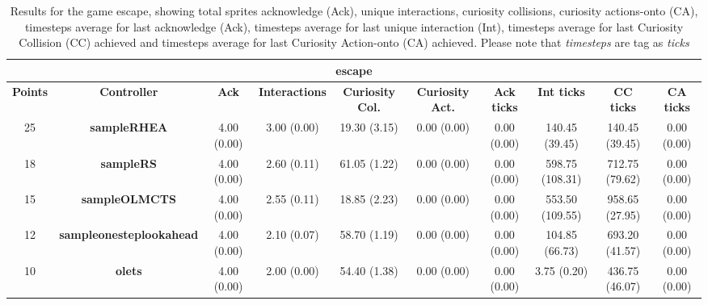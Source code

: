 \begin{table*}[!t]
\begin{center}
\begin{adjustbox}{width=1\textwidth}
\begin{tabular}{|c|c|c|c|c|c|c|c|c|c|}
\multicolumn{10}{c}{\textbf{escape}}\\
\hline
\textbf{Points} & \textbf{Controller} & \textbf{Ack} & \textbf{Interactions} & \textbf{Curiosity Col.} & \textbf{Curiosity Act.} & \textbf{Ack ticks} & \textbf{Int ticks} & \textbf{CC ticks} & \textbf{CA ticks}\\
\hline
25 & \textbf{sampleRHEA} & 4.00 (0.00) & 3.00 (0.00) & 19.30 (3.15) & 0.00 (0.00) & 0.00 (0.00) & 140.45 (39.45) & 140.45 (39.45) & 0.00 (0.00)
 \\
\hline
18 & \textbf{sampleRS} & 4.00 (0.00) & 2.60 (0.11) & 61.05 (1.22) & 0.00 (0.00) & 0.00 (0.00) & 598.75 (108.31) & 712.75 (79.62) & 0.00 (0.00)
 \\
\hline
15 & \textbf{sampleOLMCTS} & 4.00 (0.00) & 2.55 (0.11) & 18.85 (2.23) & 0.00 (0.00) & 0.00 (0.00) & 553.50 (109.55) & 958.65 (27.95) & 0.00 (0.00)
 \\
\hline
12 & \textbf{sampleonesteplookahead} & 4.00 (0.00) & 2.10 (0.07) & 58.70 (1.19) & 0.00 (0.00) & 0.00 (0.00) & 104.85 (66.73) & 693.20 (41.57) & 0.00 (0.00)
 \\
\hline
10 & \textbf{olets} & 4.00 (0.00) & 2.00 (0.00) & 54.40 (1.38) & 0.00 (0.00) & 0.00 (0.00) & 3.75 (0.20) & 436.75 (46.07) & 0.00 (0.00)
 \\
\hline
\end{tabular}
\end{adjustbox}
\caption{Results for the game escape, showing total sprites acknowledge (Ack), unique interactions, curiosity collisions, curiosity actions-onto (CA), timesteps average for last acknowledge (Ack),  timesteps average for last unique interaction (Int), timesteps average for last Curiosity Collision (CC) achieved and timesteps average for last Curiosity Action-onto (CA) achieved. Please note that \textit{timesteps} are tag as \textit{ticks}}
\label{tab:weights}
\end{center}
\end{table*}
